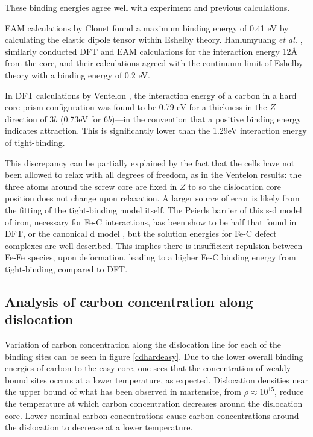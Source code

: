 \documentclass[a4paper,11pt]{article}
\begin{document}
These binding energies agree well with experiment and previous calculations.

EAM calculations by Clouet \cite{Clouet2008,Becquart2007} found a maximum binding energy of 0.41 eV by
calculating the elastic dipole tensor within Eshelby theory. Hanlumyuang \emph{et al.}
\cite{Hanlumyuang2010}, similarly conducted DFT and EAM calculations for the interaction energy
12\AA{} from the core, and their calculations agreed with the continuum limit of Eshelby theory with
a binding energy of 0.2 eV.

In DFT calculations by Ventelon \cite{Ventelon2015}, the interaction energy of a carbon in a hard
core prism configuration was found to be 0.79 eV for a thickness in the \(Z\) direction of 3\(b\)
(0.73eV for \(6b\))---in the convention that a positive binding energy indicates attraction. This
is significantly lower than the 1.29eV interaction energy of tight-binding. 

This discrepancy can be partially explained by the fact that the cells have not been allowed to
relax with all degrees of freedom, as in the Ventelon results: the three atoms around the screw
core are fixed in \(Z\) to so the dislocation core position does not change upon relaxation. A
larger source of error is likely from the fitting of the tight-binding model itself. The
Peierls barrier of this s-d model of iron, necessary for Fe-C interactions, has been show to be
half that found in DFT, or the canonical d model \cite{Simpson2019}, but the solution energies for
Fe-C defect complexes are well described. This implies there is insufficient repulsion between
Fe-Fe species, upon deformation, leading to a higher Fe-C binding energy from tight-binding,
compared to DFT.




\subsection{Analysis of carbon concentration along dislocation}
\label{sec:org7906a3b}

Variation of carbon concentration along the dislocation line for each of the binding sites can be
seen in figure \ref{cdhardeasy}. Due to the lower overall binding energies of carbon to the easy core, one
sees that the concentration of weakly bound sites occurs at a lower temperature, as
expected. Dislocation densities near the upper bound of what has been observed in martensite,
from \(\rho \approx10^{15}\), reduce the temperature at which carbon concentration decreases around the
dislocation core. Lower nominal carbon concentrations cause carbon concentrations
around the dislocation to decrease at a lower temperature. 
\end{document}
